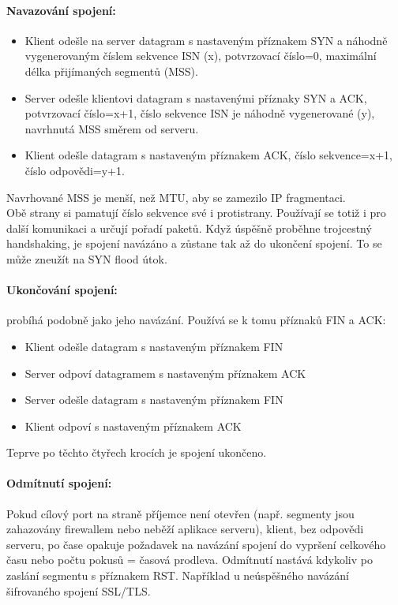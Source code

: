 \documentclass[10pt,a4paper]{article}
\begin{document}
\paragraph{Navazování spojení:}
\begin{itemize}
	\item Klient odešle na server datagram s nastaveným příznakem SYN a náhodně vygenerovaným číslem sekvence ISN (x), potvrzovací číslo=0, maximální délka přijímaných segmentů (MSS).
	\item Server odešle klientovi datagram s nastavenými příznaky SYN a ACK, potvrzovací číslo=x+1, číslo sekvence ISN je náhodně vygenerované (y), navrhnutá MSS směrem od serveru.
	\item Klient odešle datagram s nastaveným příznakem ACK, číslo sekvence=x+1, číslo odpovědi=y+1.
\end{itemize}
Navrhované MSS je menší, než MTU, aby se zamezilo IP fragmentaci. \\
Obě strany si pamatují číslo sekvence své i protistrany. Používají se totiž i pro další komunikaci a určují pořadí paketů. Když úspěšně proběhne trojcestný handshaking, je spojení navázáno a zůstane tak až do ukončení spojení. To se může zneužít na SYN flood útok.
\paragraph{Ukončování spojení:} probíhá podobně jako jeho navázání. Používá se k tomu příznaků FIN a ACK:
\begin{itemize}
	\item Klient odešle datagram s nastaveným příznakem FIN
	\item Server odpoví datagramem s nastaveným příznakem ACK
	\item Server odešle datagram s nastaveným příznakem FIN
	\item Klient odpoví s nastaveným příznakem ACK
\end{itemize}
Teprve po těchto čtyřech krocích je spojení ukončeno.
\paragraph{Odmítnutí spojení:}
Pokud cílový port na straně příjemce není otevřen (např. segmenty jsou zahazovány firewallem nebo neběží aplikace serveru), klient, bez odpovědi serveru, po čase opakuje požadavek na navázání spojení do vypršení celkového času nebo počtu pokusů = časová prodleva. Odmítnutí nastává kdykoliv po zaslání segmentu s příznakem RST. Například u neúspěšného navázání šifrovaného spojení SSL/TLS.
\end{document}
